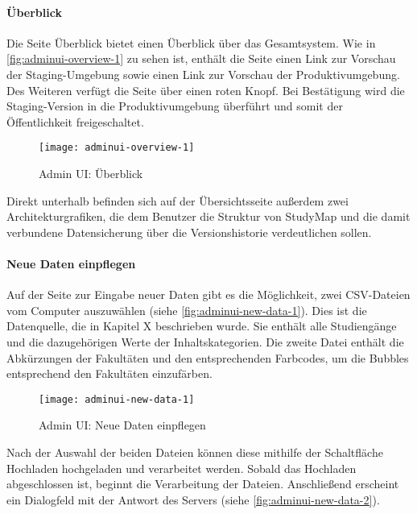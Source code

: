 \paragraph*{Überblick}
Die Seite \glqq Überblick\grqq{} bietet einen Überblick über das Gesamtsystem. Wie in \autoref{fig:adminui-overview-1} zu sehen ist, enthält die Seite einen Link zur Vorschau der Staging-Umgebung sowie einen Link zur Vorschau der Produktivumgebung. Des Weiteren verfügt die Seite über einen roten Knopf. Bei Bestätigung wird die Staging-Version in die Produktivumgebung überführt und somit der Öffentlichkeit freigeschaltet.

\begin{figure}[H]
    \centering
    \texttt{[image: adminui-overview-1]}
    \caption{Admin UI: Überblick}
    \label{fig:adminui-overview-1}
\end{figure}

Direkt unterhalb befinden sich auf der Übersichtsseite außerdem zwei Architekturgrafiken, die dem Benutzer die Struktur von StudyMap und die damit verbundene Datensicherung über die Versionshistorie verdeutlichen sollen.

\paragraph*{Neue Daten einpflegen}
Auf der Seite zur Eingabe neuer Daten gibt es die Möglichkeit, zwei CSV-Dateien vom Computer auszuwählen (siehe \autoref{fig:adminui-new-data-1}). Dies ist die Datenquelle, die in Kapitel X beschrieben wurde. Sie enthält alle Studiengänge und die dazugehörigen Werte der Inhaltskategorien. Die zweite Datei enthält die Abkürzungen der Fakultäten und den entsprechenden Farbcodes, um die Bubbles entsprechend den Fakultäten einzufärben.

\begin{figure}[H]
    \centering
    \texttt{[image: adminui-new-data-1]}
    \caption{Admin UI: Neue Daten einpflegen}
    \label{fig:adminui-new-data-1}
\end{figure}

Nach der Auswahl der beiden Dateien können diese mithilfe der Schaltfläche \glqq Hochladen\grqq{} hochgeladen und verarbeitet werden. Sobald das Hochladen abgeschlossen ist, beginnt die Verarbeitung der Dateien. Anschließend erscheint ein Dialogfeld mit der Antwort des Servers (siehe \autoref{fig:adminui-new-data-2}).

